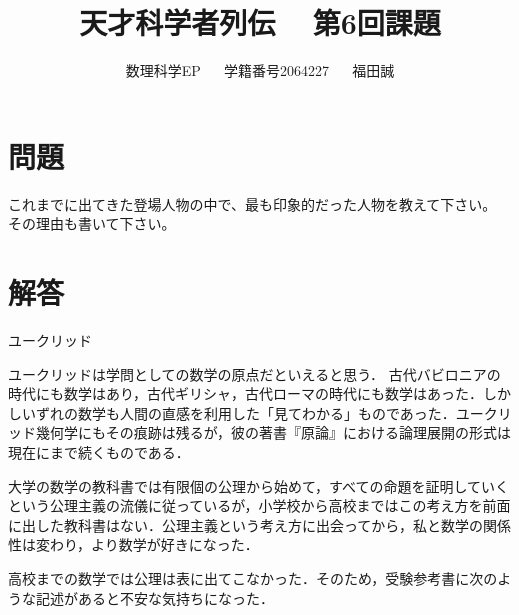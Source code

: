 \documentclass[12pt]{jarticle}
\title{天才科学者列伝 ~ 第6回課題}
\date{}
\author{\vspace{5mm}数理科学EP ~~ 学籍番号2064227 ~~ 福田誠}
\theoremstyle{break}        %
\newcommand{\?}{\textcolor{red}{??}}
\begin{document}
\maketitle


\section*{問題}

これまでに出てきた登場人物の中で、最も印象的だった人物を教えて下さい。
その理由も書いて下さい。

\section*{解答}

ユークリッド

ユークリッドは学問としての数学の原点だといえると思う．
古代バビロニアの時代にも数学はあり，古代ギリシャ，古代ローマの時代にも数学はあった．しかしいずれの数学も人間の直感を利用した「見てわかる」ものであった．ユークリッド幾何学にもその痕跡は残るが，彼の著書『原論』における論理展開の形式は現在にまで続くものである．

大学の数学の教科書では有限個の公理から始めて，すべての命題を証明していくという公理主義の流儀に従っているが，小学校から高校まではこの考え方を前面に出した教科書はない．公理主義という考え方に出会ってから，私と数学の関係性は変わり，より数学が好きになった．

高校までの数学では公理は表に出てこなかった．そのため，受験参考書に次のような記述があると不安な気持ちになった．
\end{document}
